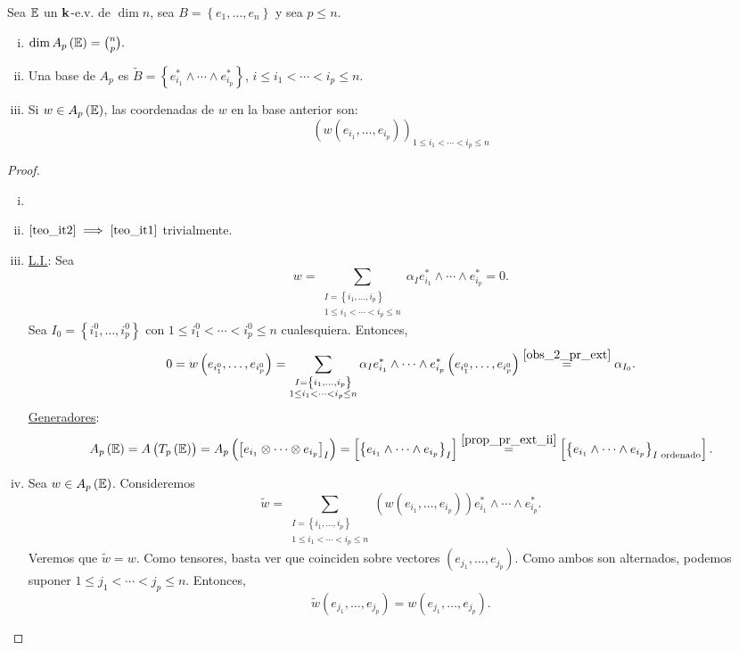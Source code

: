 \begin{teo}
    Sea $\mathbb{E}$ un $\mathbf{k}$-e.v. de $\dim n$, sea $B=\left\{
    e_1, \dots , e_n\right\}$ y sea $p\leq n$.
    \begin{enumerate}[i)]
        \item \label{teo_it1}
            $ \dim A_p\left( \mathbb{E} \right) = \binom{n}{p}. $
        \item \label{teo_it2}
            Una base de $A_p$ es $\tilde{B} = \left\{e_{i_1}^* \wedge \cdots \wedge e_{i_p}^* \right\}$, $i\leq i_1 < \cdots < i_p \leq n$.
        \item
        	Si $w \in A_p\left( \mathbb{E} \right)$, las coordenadas de $w$ en la base anterior son:
        	\[
        		\left( w \left( e_{i_1}, \dots , e_{i_p} \right) \right)_{1\leq i_1 < \cdots < i_p \leq n}
        	\]
    \end{enumerate}
\end{teo}
\begin{proof}
	\begin{enumerate}[i)]
		\item[]
		\item
			$\ref{teo_it2} \implies \ref{teo_it1}$ trivialmente.
		\item
			\underline{L.I.}: Sea
			\[
				w=\sum_{\substack{I=\left\{ i_1, \dots , i_p \right\} \\ 1\leq i_1 < \cdots < i_p \leq n}} \alpha _I e_{i_1}^* \wedge \cdots \wedge e_{i_p}^*=0.
			\]
			Sea $I_0=\left\{ i_1^0, \dots , i_p^0 \right\} $ con $1\leq i_1^0 < \cdots < i_p^0 \leq n$ cualesquiera. Entonces,
			\[
				0=w \left( e_{i_1^0} , \dots , e_{i_p^0} \right)= \sum_{\substack{I=\left\{ i_1, \dots , i_p \right\} \\ 1\leq i_1 < \cdots < i_p \leq n}} \alpha _I e_{i_1}^* \wedge \cdots \wedge e_{i_p}^* \left( e_{i_1^0} , \dots , e_{i_p^0} \right) \stackrel{\ref{obs_2_pr_ext}} = \alpha _ {I_0}.
			\]
			\underline{Generadores}:
			\[
				A_p \left( \mathbb{E} \right) = A \left( T_p \left( \mathbb{E} \right) \right) = A_p \left( \left[ e_{i_1} \otimes \cdots \otimes e_{i_p} \right]_I \right) = \left[ \left\{ e_{i_1} \wedge \cdots \wedge e_{i_p} \right\}_I \right] \stackrel{\ref{prop_pr_ext_ii}}= \left[ \left\{ e_{i_1} \wedge \cdots \wedge e_{i_p} \right\}_{I\text{ ordenado}} \right].
			\]
		\item
			Sea $w \in A_p\left(\mathbb{E}\right)$. Consideremos
			\[
				\tilde{w}=\sum_{\substack{I=\left\{ i_1, \dots , i_p \right\} \\ 1\leq i_1 < \cdots < i_p \leq n}} \left( w \left( e_{i_1} , \dots , e_{i_p} \right) \right) e_{i_1}^* \wedge \cdots \wedge e_{i_p}^*.
			\]
			Veremos que $\tilde{w}=w$. Como tensores, basta ver que coinciden sobre vectores $\left( e_{j_1}, \dots , e_{j_p} \right)$. Como ambos son alternados, podemos suponer $1 \leq j_1  < \cdots < j_p \leq n$. Entonces,
			\[
				\tilde{w} \left( e_{j_1}, \dots , e_{j_p} \right) = w \left( e_{j_1}, \dots , e_{j_p} \right).
			\]

	\end{enumerate}
\end{proof}

